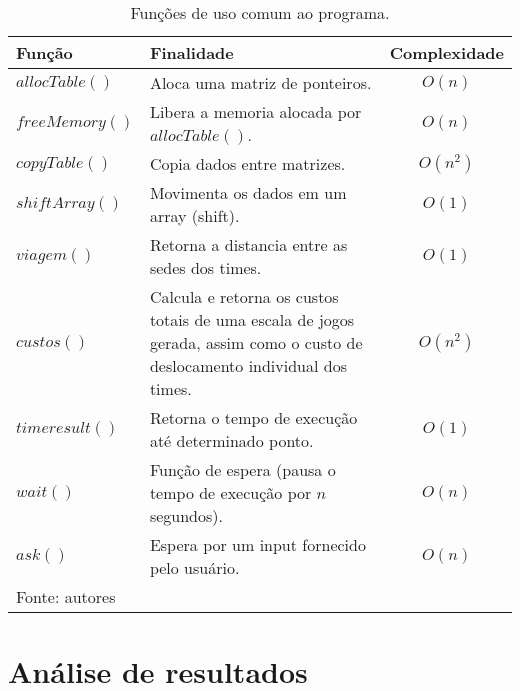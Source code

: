 \documentclass[12pt,a4paper]{article}
\begin{document}
\begin{table}[H]
	\renewcommand{\arraystretch}{1}
	\centering
	\caption{Funções de uso comum ao programa.}
	\label{tab:comum}
	\begin{tabular}{p{2.7cm} p{9.5cm} c}
		\toprule 
		Função & Finalidade & Complexidade \\ 
		\midrule
		$allocTable()$ & Aloca uma matriz de ponteiros. & $O(n)$ \\
		$freeMemory()$ & Libera a memoria alocada por $allocTable()$. & $O(n)$ \\
		$copyTable()$ & Copia dados entre matrizes. & $O(n^2)$ \\
		$shiftArray()$ & Movimenta os dados em um array (shift). & $O(1)$ \\
		$viagem()$ & Retorna a distancia entre as sedes dos times. & $O(1)$ \\
		$custos()$ & Calcula e retorna os custos totais de uma escala de jogos gerada, assim como o custo de deslocamento individual dos times. & $O(n^2)$ \\
		$timeresult()$ & Retorna o tempo de execução até determinado ponto. & $O(1)$ \\
		$wait()$ & Função de espera (pausa o tempo de execução por $n$ segundos). & $O(n)$ \\
		$ask()$ & Espera por um input fornecido pelo usuário. & $O(n)$ \\
		\bottomrule
		\footnotesize Fonte: autores
	\end{tabular}
\end{table}

\section{Análise de resultados}
\end{document}
